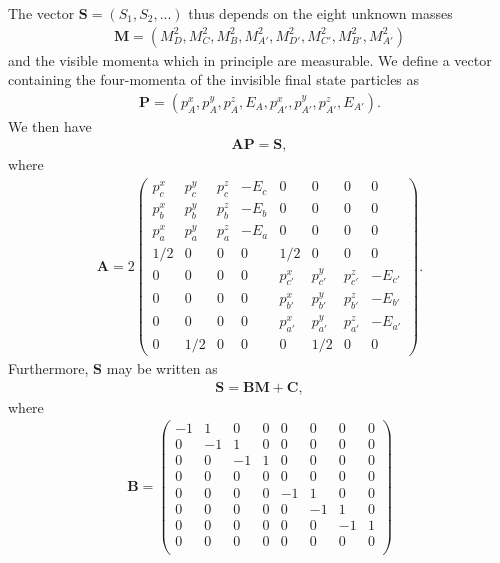 \documentclass[twoside,english]{uiofysmaster}
\begin{document}
The vector $\mathbf{S} = (S_1, S_2, ...)$ thus depends on the eight unknown masses 
\begin{align}
	\mathbf{M} = (M_D^2, M_C^2, M_B^2, M_{A'}^2, M_{D'}^2, M_{C'}^2, M_{B'}^2, M_{A'}^2)
\end{align}
and the visible momenta which in principle are measurable. We define a vector containing the four-momenta of the invisible final state particles as
\begin{align}
	\mathbf{P} = (p_A^x, p_A^y, p_A^z, E_A, p_{A'}^x, p_{A'}^y, p_{A'}^z, E_{A'}). \label{eq:Pvec}
\end{align}
We then have
\begin{align}
	\mathbf{A}\mathbf{P} = \mathbf{S},\label{eq:APS}
\end{align}
where
\begin{align}
	\mathbf{A} = 2 \begin{pmatrix}
						p_c^x & p_c^y & p_c^z & -E_c & 0 & 0 & 0 & 0 \\
						p_b^x & p_b^y & p_b^z & -E_b & 0 & 0 & 0 & 0 \\
						p_a^x & p_a^y & p_a^z & -E_a & 0 & 0 & 0 & 0 \\
						1/2 & 0 & 0 & 0 & 1/2 & 0 & 0 & 0\\
						0 & 0 & 0 & 0 & p_{c'}^x & p_{c'}^y & p_{c'}^z & -E_{c'} \\
						0 & 0 & 0 & 0 & p_{b'}^x & p_{b'}^y & p_{b'}^z & -E_{b'} \\
						0 & 0 & 0 & 0 & p_{a'}^x & p_{a'}^y & p_{a'}^z & -E_{a'} \\
						0 & 1/2 & 0 & 0 & 0 & 1/2 & 0 & 0
					\end{pmatrix}. \label{eq:Amatrix_orig}
\end{align}
Furthermore, $\mathbf{S}$ may be written as 
\begin{align}
	\mathbf{S} = \mathbf{B} \mathbf{M} + \mathbf{C},\label{eq:SBMC}
\end{align}
where
\begin{align}
	\mathbf{B} = \begin{pmatrix}
					-1 & 1 & 0 & 0 & 0 & 0 & 0 & 0 \\
					0 & -1 & 1 & 0 & 0 & 0 & 0 & 0 \\
					0 & 0 & -1 & 1 & 0 & 0 & 0 & 0 \\
					0 & 0 & 0 & 0 & 0 & 0 & 0 & 0 \\
					0 & 0 & 0 & 0 & -1 & 1 & 0 & 0 \\
					0 & 0 & 0 & 0 & 0 & -1 & 1 & 0 \\
					0 & 0 & 0 & 0 & 0 & 0 & -1 & 1 \\
					0 & 0 & 0 & 0 & 0 & 0 & 0 & 0 \\
	\end{pmatrix}
\end{align}
\end{document}
